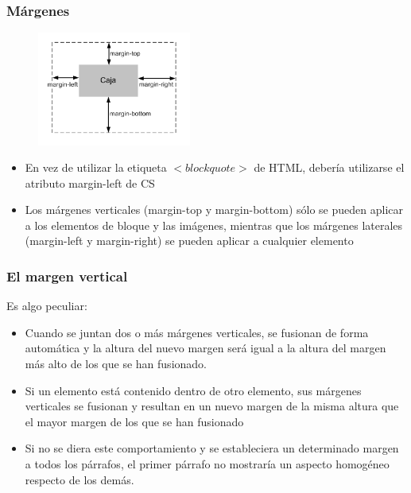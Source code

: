 \documentclass[ucs]{beamer}
\begin{document}


\begin{frame}
\frametitle{Márgenes}


\begin{center}
\begin{figure}[p]
\includegraphics[width=0.45\textwidth]{figs/f0428.png}
\end{figure}
\end{center}

\begin{itemize}
  \item En vez de utilizar la etiqueta $<blockquote>$ de HTML, debería utilizarse el atributo margin-left de CS
  \item Los márgenes verticales (margin-top y margin-bottom) sólo se pueden aplicar a los elementos de bloque y las imágenes, mientras que los márgenes laterales (margin-left y margin-right) se pueden aplicar a cualquier elemento
\end{itemize}

\end{frame}



\begin{frame}
\frametitle{El margen vertical}

Es algo peculiar:

\begin{itemize}
  \item Cuando se juntan dos o más márgenes verticales, se fusionan de forma automática y la altura del nuevo margen será igual a la altura del margen más alto de los que se han fusionado.
  \item Si un elemento está contenido dentro de otro elemento, sus márgenes verticales se fusionan y resultan en un nuevo margen de la misma altura que el mayor margen de los que se han fusionado
  \item Si no se diera este comportamiento y se estableciera un determinado margen a todos los párrafos, el primer párrafo no mostraría un aspecto homogéneo respecto de los demás.
\end{itemize}

\end{frame}
\end{document}
